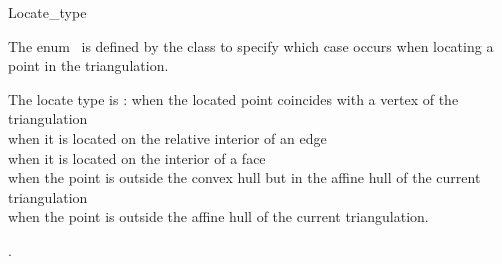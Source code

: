 

\begin{ccRefEnum}{Locate_type}  %


\ccDefinition
  
The enum \ccRefName\ is defined by the
class to specify
which case occurs when locating a point in the triangulation. 

{The locate type is :
 when the located point coincides 
with a vertex of the triangulation \\
 when it is located on the relative interior of an edge \\
 when it is located on the interior of a face  \\
 when the point
is  outside the convex hull but in the affine hull of the current triangulation \\
when the point is outside the affine hull
of the current triangulation.}

\ccSeeAlso
{}.

\end{ccRefEnum}




